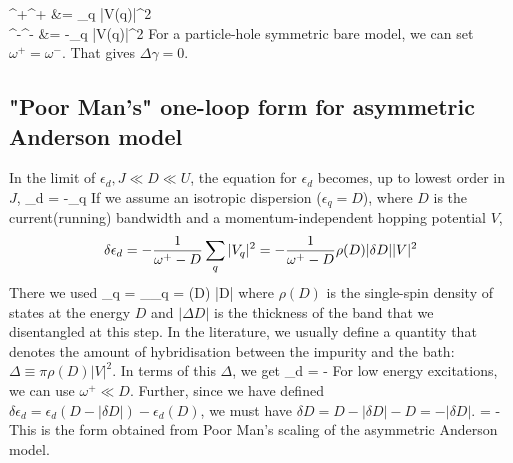 \documentclass[14pt]{extarticle}
\numberwithin{equation}{section}
\begin{document}
\beq
\Delta^+\gamma\equiv\Delta^+ &= \sum_q |V(q)|^2\\
\Delta^-\gamma\equiv\Delta^- &= -\sum_q |V(q)|^2
\eeq
{}
For a particle-hole symmetric bare model, we can set \(\omega^+ = \omega^-\). That gives \(\Delta \gamma = 0\).

\subsection{"Poor Man's" one-loop form for asymmetric Anderson model}
In the limit of \(\epsilon_d, J \ll D \ll U \), the equation for \(\epsilon_d\) becomes, up to lowest order in \(J\),
\beq
\delta \epsilon_d = -\sum_q 
\eeq
If we assume an isotropic dispersion (\(\epsilon_q = D\)), where \(D\) is the current(running) bandwidth and a momentum-independent hopping potential \(V\),
\begin{gather*}
	\delta \epsilon_d = -\frac{1}{\omega^+ - D}\sum_q |V_q|^2 = -\frac{1}{\omega^+ - D}\rho(D) |\delta D| |V|^2
\end{gather*}
There we used 
\beq
\sum_q = \sum_{\epsilon_q\in{}} = \rho(D) |\delta D|
\eeq
where \(\rho(D)\) is the single-spin density of states at the energy \(D\) and \(|\Delta D|\) is the thickness of the band that we disentangled at this step. In the literature, we usually define a quantity that denotes the amount of hybridisation between the impurity and the bath: \(\Delta \equiv \pi \rho(D) |V|^2\). In terms of this \(\Delta\), we get
\beq
\delta \epsilon_d = -
\eeq
For low energy excitations, we can use \(\omega^+ \ll D\). Further, since we have defined \(\delta \epsilon_d = \epsilon_d(D-|\delta D|) - \epsilon_d(D)\), we must have \(\delta D = D - |\delta D| - D = - |\delta D|\).
\beq
{} = -
\eeq
This is the form obtained from Poor Man's scaling of the asymmetric Anderson model.
\end{document}
